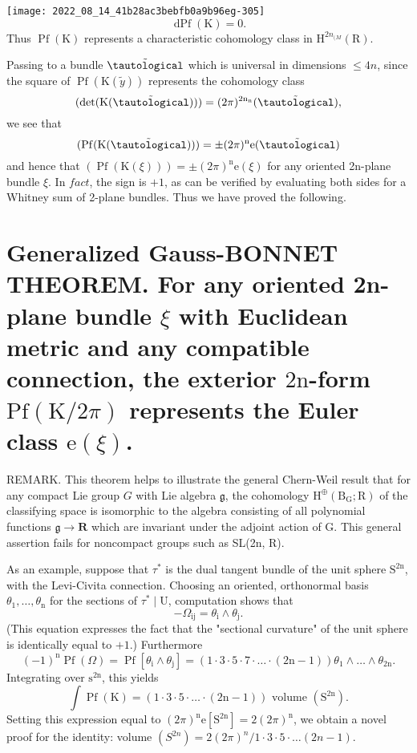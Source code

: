 \documentclass[10pt]{article}
\begin{document}
\texttt{[image: 2022\_08\_14\_41b28ac3bebfb0a9b96eg-305]}
$$
\operatorname{dPf}(\mathrm{K})=0 .
$$
Thus $\operatorname{Pf}(\mathrm{K})$ represents a characteristic cohomology class in $\mathrm{H}^{2 n_{(M}}(\mathrm{R})$.

Passing to a bundle $\tilde{\tautological}$ which is universal in dimensions $\leq 4 n$, since the square of $\operatorname{Pf}(\mathrm{K}(\tilde{y}))$ represents the cohomology class
$$
(\operatorname{det}(\mathrm{K}(\tilde{\tautological})))=(2 \pi)^{2 \mathrm{n}_{\mathrm{n}}}(\tilde{\tautological}),
$$
we see that
$$
(\operatorname{Pf}(\mathrm{K}(\tilde{\tautological})))=\pm(2 \pi)^{\mathrm{n}} \mathrm{e}(\tilde{\tautological})
$$
and hence that $(\operatorname{Pf}(\mathrm{K}(\xi)))=\pm(2 \pi)^{\mathrm{n}} \mathrm{e}(\xi)$ for any oriented 2n-plane bundle $\xi$. In $f a c t$, the sign is $+1$, as can be verified by evaluating both sides for a Whitney sum of 2-plane bundles. Thus we have proved the following.

\section{Generalized Gauss-BONNET THEOREM. For any oriented 2n-plane bundle $\xi$ with Euclidean metric and any compatible connection, the exterior $2 \mathrm{n}$-form $\mathrm{Pf}(\mathrm{K} / 2 \pi)$ represents the Euler class $\mathrm{e}(\xi)$.}
REMARK. This theorem helps to illustrate the general Chern-Weil result that for any compact Lie group $G$ with Lie algebra $\mathfrak{g}$, the cohomology $\mathrm{H}^{\oplus}\left(\mathrm{B}_{\mathrm{G}} ; \mathrm{R}\right)$ of the classifying space is isomorphic to the algebra consisting of all polynomial functions $\mathfrak{g} \rightarrow \mathbf{R}$ which are invariant under the adjoint action of G. This general assertion fails for noncompact groups such as SL(2n, R).

As an example, suppose that $\tau^{*}$ is the dual tangent bundle of the unit sphere $\mathrm{S}^{2 \mathrm{n}}$, with the Levi-Civita connection. Choosing an oriented, orthonormal basis $\theta_{1}, \ldots, \theta_{\mathrm{n}}$ for the sections of $\tau^{*} \mid \mathrm{U}$, computation shows that
$$
-\Omega_{\mathrm{ij}}=\theta_{\mathrm{i}} \wedge \theta_{\mathrm{j}} .
$$
(This equation expresses the fact that the "sectional curvature" of the unit sphere is identically equal to $+1$.) Furthermore
$$
(-1)^{\mathrm{n}} \operatorname{Pf}(\Omega)=\operatorname{Pf}\left[\theta_{\mathrm{i}} \wedge \theta_{\mathrm{j}}\right]=(1 \cdot 3 \cdot 5 \cdot 7 \cdot \ldots \cdot(2 \mathrm{n}-1)) \theta_{1} \wedge \ldots \wedge \theta_{2 \mathrm{n}} .
$$
Integrating over $\mathrm{s}^{2 \mathrm{n}}$, this yields
$$
\int \operatorname{Pf}(\mathrm{K})=(1 \cdot 3 \cdot 5 \cdot \ldots \cdot(2 \mathrm{n}-1)) \text { volume }\left(\mathrm{S}^{2 \mathrm{n}}\right) .
$$
Setting this expression equal to $(2 \pi)^{\mathrm{n}} \mathrm{e}\left[\mathrm{S}^{2 \mathrm{n}}\right]=2(2 \pi)^{\mathrm{n}}$, we obtain a novel proof for the identity: volume $\left(S^{2 n}\right)=2(2 \pi)^{n} / 1 \cdot 3 \cdot 5 \cdot \ldots(2 n-1)$.
\end{document}
